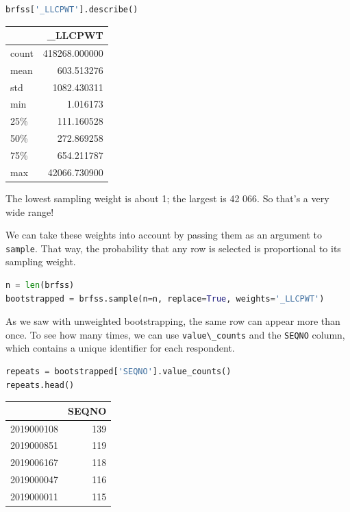 \begin{lstlisting}[language=Python,style=source]
brfss['_LLCPWT'].describe()
\end{lstlisting}

\begin{tabular}{lr}
\toprule
{} &        \_LLCPWT \\
\midrule
count &  418268.000000 \\
mean  &     603.513276 \\
std   &    1082.430311 \\
min   &       1.016173 \\
25\%   &     111.160528 \\
50\%   &     272.869258 \\
75\%   &     654.211787 \\
max   &   42066.730900 \\
\bottomrule
\end{tabular}

The lowest sampling weight is about 1; the largest is 42 066. So that's
a very wide range!

We can take these weights into account by passing them as an argument to
\passthrough{\lstinline!sample!}. That way, the probability that any row
is selected is proportional to its sampling weight.

\begin{lstlisting}[language=Python,style=source]
n = len(brfss)
bootstrapped = brfss.sample(n=n, replace=True, weights='_LLCPWT')
\end{lstlisting}

As we saw with unweighted bootstrapping, the same row can appear more
than once. To see how many times, we can use
\passthrough{\lstinline!value\_counts!} and the
\passthrough{\lstinline!SEQNO!} column, which contains a unique
identifier for each respondent.

\begin{lstlisting}[language=Python,style=source]
repeats = bootstrapped['SEQNO'].value_counts()
repeats.head()
\end{lstlisting}

\begin{tabular}{lr}
\toprule
{} &  SEQNO \\
\midrule
2019000108 &    139 \\
2019000851 &    119 \\
2019006167 &    118 \\
2019000047 &    116 \\
2019000011 &    115 \\
\bottomrule
\end{tabular}

